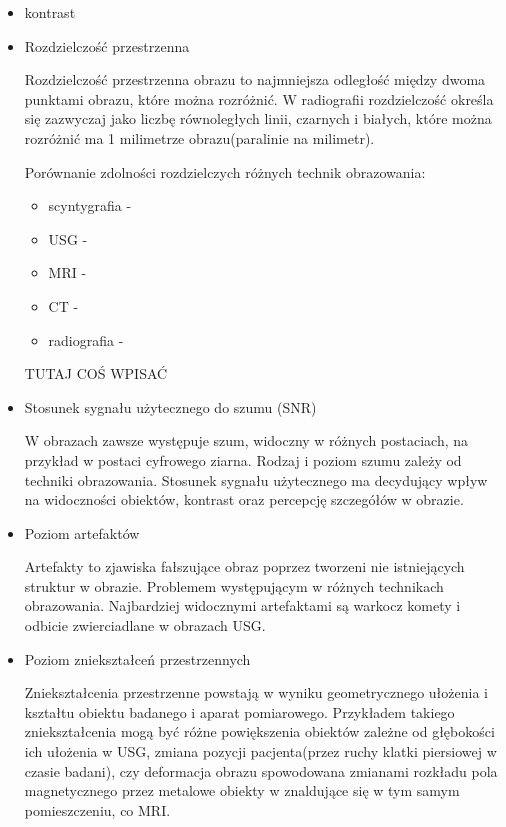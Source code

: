 \begin{itemize}
    \item kontrast

    \item Rozdzielczość przestrzenna

    Rozdzielczość przestrzenna obrazu to najmniejsza odległość między dwoma punktami obrazu, które można rozróżnić.
    W radiografii rozdzielczość określa się zazwyczaj jako liczbę równoległych linii, czarnych i białych, które można rozróżnić ma 1 milimetrze obrazu(paralinie na milimetr).

    Porównanie zdolności rozdzielczych różnych technik obrazowania:
    \begin{itemize}
        \item scyntygrafia - 
        \item USG - 
        \item MRI -
        \item CT -
        \item radiografia -
    \end{itemize}
    TUTAJ COŚ WPISAĆ

    \item Stosunek sygnału użytecznego do szumu (SNR)

    W obrazach zawsze występuje szum, widoczny w różnych postaciach, na przykład w postaci cyfrowego ziarna.
    Rodzaj i poziom szumu zależy od techniki obrazowania.
    Stosunek sygnału użytecznego ma decydujący wpływ na widoczności obiektów, kontrast oraz percepcję szczegółów w obrazie.

    \item Poziom artefaktów
    
    Artefakty to zjawiska fałszujące obraz poprzez tworzeni nie istniejących struktur w obrazie.
    Problemem występującym w różnych technikach obrazowania.
    Najbardziej widocznymi artefaktami są warkocz komety i odbicie zwierciadlane w obrazach USG.

    \item Poziom zniekształceń przestrzennych
    
    Zniekształcenia przestrzenne powstają w wyniku geometrycznego ułożenia i kształtu obiektu badanego i aparat pomiarowego.
    Przykładem takiego zniekształcenia mogą być różne powiększenia obiektów zależne od głębokości ich ułożenia w USG, zmiana pozycji pacjenta(przez ruchy klatki piersiowej w czasie badani), czy deformacja obrazu spowodowana zmianami rozkładu pola magnetycznego przez metalowe obiekty w znaldujące się w tym samym pomieszczeniu, co MRI.

\end{itemize}

